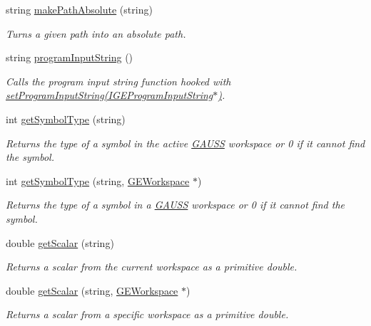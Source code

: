 \begin{DoxyCompactItemize}
string \hyperlink{class_g_a_u_s_s_a9b74886bf0091ca9d5bd17feae95ea05}{make\-Path\-Absolute} (string)
\begin{DoxyCompactList}\small\item\em Turns a given path into an absolute path. \end{DoxyCompactList}\item 
string \hyperlink{class_g_a_u_s_s_a7e1284a1d44e68aadb6c70e4416abb7b}{program\-Input\-String} ()
\begin{DoxyCompactList}\small\item\em Calls the program input string function hooked with \hyperlink{class_g_a_u_s_s_ae82b5bfdf26971433c46936a812506c3}{set\-Program\-Input\-String(\-I\-G\-E\-Program\-Input\-String$\ast$)}. \end{DoxyCompactList}\item 
int \hyperlink{class_g_a_u_s_s_aadbb588e6cb82219df8571ea17027d3c}{get\-Symbol\-Type} (string)
\begin{DoxyCompactList}\small\item\em Returns the type of a symbol in the active \hyperlink{class_g_a_u_s_s}{G\-A\-U\-S\-S} workspace or 0 if it cannot find the symbol. \end{DoxyCompactList}\item 
int \hyperlink{class_g_a_u_s_s_abc7d671bcf6ae784070a78bae1546f7a}{get\-Symbol\-Type} (string, \hyperlink{class_g_e_workspace}{G\-E\-Workspace} $\ast$)
\begin{DoxyCompactList}\small\item\em Returns the type of a symbol in a \hyperlink{class_g_a_u_s_s}{G\-A\-U\-S\-S} workspace or 0 if it cannot find the symbol. \end{DoxyCompactList}\item 
double \hyperlink{class_g_a_u_s_s_a7c44bea0167fd88360b3926904a5cf2f}{get\-Scalar} (string)
\begin{DoxyCompactList}\small\item\em Returns a scalar from the current workspace as a primitive {\ttfamily double}. \end{DoxyCompactList}\item 
double \hyperlink{class_g_a_u_s_s_ade5065d7eec4f6170496571a07e5dc4c}{get\-Scalar} (string, \hyperlink{class_g_e_workspace}{G\-E\-Workspace} $\ast$)
\begin{DoxyCompactList}\small\item\em Returns a scalar from a specific workspace as a primitive {\ttfamily double}. \end{DoxyCompactList}\item 

\end{DoxyCompactItemize}
